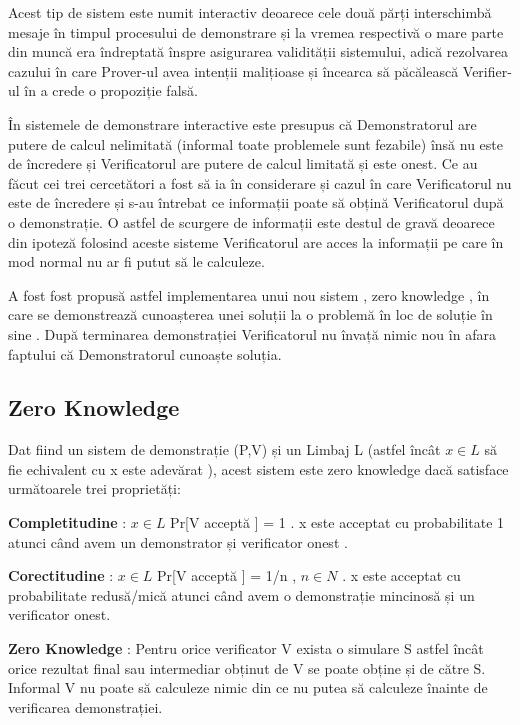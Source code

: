 \documentclass[12pt, letterpaper]{article}
\begin{document}
    Acest tip de sistem este numit interactiv deoarece cele două părți interschimbă mesaje în timpul procesului de demonstrare și la vremea respectivă o mare parte din muncă era îndreptată înspre asigurarea validității sistemului, adică rezolvarea cazului în care Prover-ul avea intenții malițioase și încearca să păcălească Verifier-ul în a crede o propoziție falsă.

	În sistemele de demonstrare interactive este presupus că Demonstratorul are putere de calcul nelimitată (informal toate problemele sunt fezabile) însă nu este de încredere și Verificatorul are putere de calcul limitată și este onest. Ce au făcut cei trei cercetători a fost să ia în considerare și cazul în care Verificatorul nu este de încredere și s-au întrebat ce informații poate să obțină Verificatorul după o demonstrație. O astfel de scurgere de informații este destul de gravă deoarece din ipoteză folosind aceste sisteme Verificatorul are acces la informații pe care în mod normal nu ar fi putut să le calculeze. 

	A fost fost propusă astfel implementarea unui nou sistem , zero knowledge , în care se demonstrează cunoașterea unei soluții la o problemă în loc de soluție în sine . După terminarea demonstrației Verificatorul nu învață nimic nou în afara faptului că Demonstratorul cunoaște soluția.\cite{greenandblazewebsite}

 \subsection{Zero Knowledge}
 
 Dat fiind un sistem de demonstrație (P,V) și un Limbaj L (astfel încât $x\in L$ să fie echivalent cu x este adevărat ), acest sistem este zero knowledge dacă satisface următoarele trei proprietăți: 


\textbf{Completitudine} : $x\in L$  Pr[V acceptă ] = 1 . x este acceptat cu probabilitate 1 atunci când avem un demonstrator și verificator onest  .


\textbf{Corectitudine} : $x\in L$  Pr[V acceptă ] = 1/n , $n\in N$ . x este acceptat cu probabilitate redusă/mică  atunci când avem o demonstrație mincinosă și un verificator onest.


\textbf{Zero Knowledge} : Pentru orice verificator V exista o simulare S astfel încât orice rezultat final sau intermediar obținut de V se poate obține și de către S. Informal V nu poate să calculeze nimic din ce nu putea să calculeze înainte de verificarea demonstrației.
\end{document}
